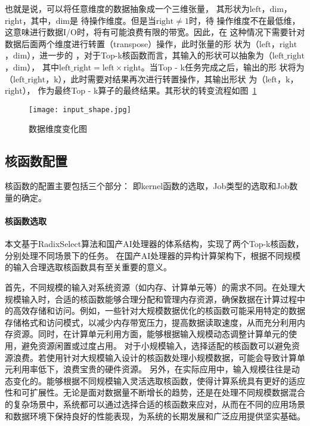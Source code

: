     也就是说，可以将任意维度的数据抽象成一个三维张量，
    其形状为\(\text{left}\)，\(\text{dim}\)，\(\text{right}\)，其中，\(\text{dim}\)是
    待操作维度。但是当\(\text{right}≠1\)时，待
    操作维度不在最低维，这意味进行数据I/O时，将有可能浪费有限的带宽。因此，在
    这种情况下需要针对数据后面两个维度进行转置（transpose）操作，此时张量的形
    状为（\(\text{left}\)，\(\text{right}\)，\(\text{dim}\)），进一步的
    ，对于Top-k核函数而言，其输入的形状可以抽象为（\(\text{left\_right}\)，\(\text{dim}\)），
    其中\(\text{left\_right}=\text{left}×\text{right}\)。当Top - k任务完成之后，输出的形
    状将为（\(\text{left\_right}\)，\(\text{k}\)），此时需要对结果再次进行转置操作，其输出形状
    为（\(\text{left}\)，\(\text{k}\)，\(\text{right}\)），
    作为最终Top - k算子的最终结果。其形状的转变流程如图~\ref{fig:input_shape}
    
    \begin{figure}[ht]
        \centering
        \texttt{[image: input\_shape.jpg]}
        \caption{数据维度变化图}
        \label{fig:input_shape}
    \end{figure}
    
    
    \subsection{核函数配置}
    核函数的配置主要包括三个部分：
    即kernel函数的选取，Job类型的选取和Job数量的确定。
        \paragraph{核函数选取}
        本文基于RadixSelect算法和国产AI处理器的体系结构，实现了两个Top-k核函数，分别处理不同场景下的任务。
        在国产AI处理器的异构计算架构下，根据不同规模的输入合理选取核函数具有至关重要的意义。

        首先，不同规模的输入对系统资源（如内存、计算单元等）的需求不同。在处理大规模输入时，合适的核函数能够合理分配和管理内存资源，确保数据在计算过程中的高效存储和访问。例如，一些针对大规模数据优化的核函数可能采用特定的数据存储格式和访问模式，以减少内存带宽压力，提高数据读取速度，从而充分利用内存资源。同时，在计算单元利用方面，能够根据输入规模动态调整计算单元的使用，避免资源闲置或过度占用。
        对于小规模输入，选择适配的核函数可以避免资源浪费。若使用针对大规模输入设计的核函数处理小规模数据，可能会导致计算单元利用率低下，浪费宝贵的硬件资源。
        另外，在实际应用中，输入规模往往是动态变化的。能够根据不同规模输入灵活选取核函数，使得计算系统具有更好的适应性和可扩展性。无论是面对数据量不断增长的趋势，还是在处理不同规模数据混合的复杂场景中，系统都可以通过选择合适的核函数来应对，从而在不同的应用场景和数据环境下保持良好的性能表现，为系统的长期发展和广泛应用提供坚实基础。




